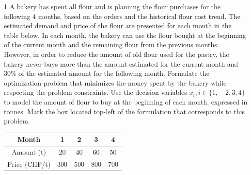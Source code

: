 
\begin{question}{1}
	\bareme{\baremeSingle}
A bakery has spent all flour and is planning the flour purchases for the following 4 months, based
on the orders and the historical flour cost trend. The estimated demand and price of the flour are
presented for each month in the table below. In each month, the bakery can use the flour bought at the
beginning of the current month and the remaining flour from the previous months. However, in order
to reduce the amount of old flour used for the pastry, the bakery never buys more than the amount
estimated for the current month and 30\% of the estimated amount for the following month.
Formulate the optimization problem that minimizes the money spent by the bakery while respecting the
problem constraints. Use the decision variables $x_i, i \in \{1,\quad 2, 3, 4\}$ to model the amount of flour to buy
at the beginning of each month, expressed in tonnes. Mark the box located top-left of the formulation
that corresponds to this problem.

	\begin{table}[h!]
	\centering
	\begin{tabular}{ccccc}
		Month & 1 & 2 & 3 & 4\\
		\hline
		Amount (t) & 20 & 40 & 60 & 50 \\
		Price (CHF/t) & 300& 500 & 800 & 700
	\end{tabular}
	\end{table}

			\begin{reponses}


\end{reponses}
\end{question}
